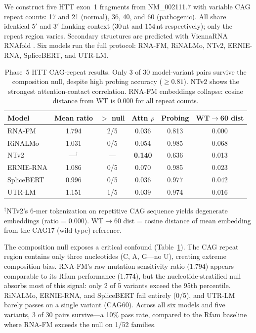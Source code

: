 \documentclass[11pt]{article}
\begin{document}
We construct five HTT exon~1 fragments from NM\_002111.7 with
variable CAG repeat counts: 17 and 21 (normal), 36, 40, and 60
(pathogenic).  All share identical 5$'$ and 3$'$ flanking context
(30\,nt and 154\,nt respectively); only the repeat region varies.
Secondary structures are predicted with ViennaRNA RNAfold
\citep{lorenz2011viennarna}.  Six models run the full protocol:
RNA-FM, RiNALMo, NTv2, ERNIE-RNA, SpliceBERT, and UTR-LM.

\begin{table}[t]
\centering
\caption{Phase~5 HTT CAG-repeat results.  Only 3 of 30
  model-variant pairs survive the composition null, despite
  high probing accuracy ($\geq 0.81$).  NTv2 shows the strongest
  attention-contact correlation.  RNA-FM embeddings
  collapse: cosine distance from WT is 0.000 for all
  repeat counts.}
\label{tab:phase5}
\begin{tabular}{@{}lccccc@{}}
\toprule
\textbf{Model} & \textbf{Mean ratio} & \textbf{$>$ null} &
  \textbf{Attn $\rho$} & \textbf{Probing} &
  \textbf{WT$\to$60 dist} \\
\midrule
RNA-FM     & 1.794 & 2/5  & 0.036 & 0.813 & 0.000 \\
RiNALMo    & 1.031 & 0/5  & 0.054 & 0.985 & 0.068 \\
NTv2       & ---$^\dagger$ & ---   & \textbf{0.140} & 0.636 & 0.013 \\
ERNIE-RNA  & 1.086 & 0/5  & 0.070 & 0.985 & 0.023 \\
SpliceBERT & 0.996 & 0/5  & 0.036 & 0.977 & 0.042 \\
UTR-LM     & 1.151 & 1/5  & 0.039 & 0.974 & 0.016 \\
\bottomrule
\end{tabular}
\medskip

\small $^\dagger$NTv2's 6-mer tokenization on repetitive CAG
sequence yields degenerate embeddings (ratio = 0.000).
WT$\to$60 dist = cosine distance of mean embedding from the
CAG17 (wild-type) reference.
\end{table}

The composition null exposes a critical confound
(Table~\ref{tab:phase5}).  The CAG repeat region contains only
three nucleotides (C, A, G---no U), creating extreme composition
bias.  RNA-FM's raw mutation sensitivity ratio (1.794) appears
comparable to its Rfam performance (1.774), but the
nucleotide-stratified null absorbs most of this signal: only 2 of 5
variants exceed the 95th percentile.  RiNALMo, ERNIE-RNA, and
SpliceBERT fail entirely (0/5), and UTR-LM barely passes on a
single variant (CAG60).  Across all six models and five variants,
3 of 30 pairs survive---a 10\% pass rate, compared to the
Rfam baseline where RNA-FM exceeds the null on 1/52 families.
\end{document}
